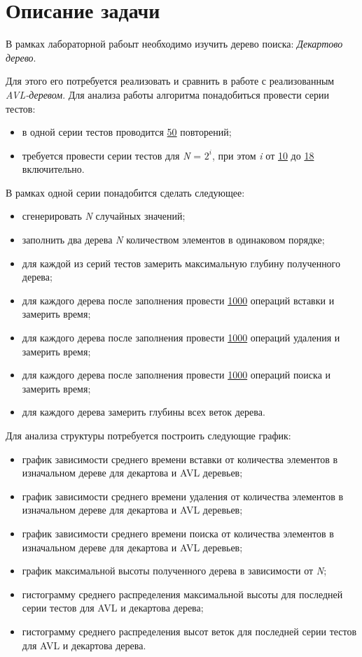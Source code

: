 \documentclass[12pt, a4paper]{report}
\begin{document}
	\section*{Описание задачи}
	\large
	В рамках лабораторной рабоыт необходимо изучить дерево поиска: \textit{Декартово дерево}. \par
	Для этого его потребуется реализовать и сравнить в работе с реализованным \textit{AVL-деревом}. Для анализа работы алгоритма понадобиться провести серии тестов:
	\begin{itemize}
		\item в одной серии тестов проводится \underline{50} повторений;
		\item требуется провести серии тестов для \textit{N} = \underline{$2^i$}, при этом \textit{i} от \underline{10} до \underline{18} включительно.
	\end{itemize}
	\par
	В рамках одной серии понадобится сделать следующее:
	\begin{itemize}
		\item сгенерировать \textit{N} случайных значений;
		\item заполнить два дерева \textit{N} количеством элементов в одинаковом порядке;
		\item для каждой из серий тестов замерить максимальную глубину полученного дерева;
		\item для каждого дерева после заполнения провести \underline{1000} операций вставки и замерить время;
		\item для каждого дерева после заполнения провести \underline{1000} операций удаления и замерить время;
		\item для каждого дерева после заполнения провести \underline{1000} операций поиска и замерить время;
		\item для каждого дерева замерить глубины всех веток дерева.
	\end{itemize}
	\par
	Для анализа структуры потребуется построить следующие график:
	\begin{itemize}
		\item график зависимости среднего времени вставки от количества элементов в изначальном дереве для декартова и AVL деревьев;
		\item график зависимости среднего времени удаления от количества элементов в изначальном дереве для декартова и AVL деревьев;
		\item график зависимости среднего времени поиска от количества элементов в изначальном дереве для декартова и AVL деревьев;
		\item график максимальной высоты полученного дерева в зависимости от \textit{N};
		\item гистограмму среднего распределения максимальной высоты для последней серии тестов для AVL и декартова дерева;
		\item гистограмму среднего распределения высот веток для последней серии тестов для AVL и декартова дерева.
	\end{itemize}
\end{document}
